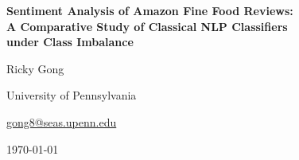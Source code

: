 \documentclass[11pt,a4paper]{article}
\begin{document}

\begin{titlepage}
  \centering
  \vspace*{1.8cm}

  {\LARGE\bfseries Sentiment Analysis of Amazon Fine Food Reviews:\\[0.4em]
   A Comparative Study of Classical NLP Classifiers\\[0.4em]
   under Class Imbalance\par}

  \vspace{1.5cm}

  {\large Ricky Gong\par}
  \vspace{0.2cm}
  {\normalsize University of Pennsylvania\par}
  \vspace{0.1cm}
  {\normalsize \href{mailto:gong8@seas.upenn.edu}{gong8@seas.upenn.edu}\par}
  \vspace{0.4cm}
  {\normalsize \today\par}

  \vspace{2cm}


\end{titlepage}
\end{document}
